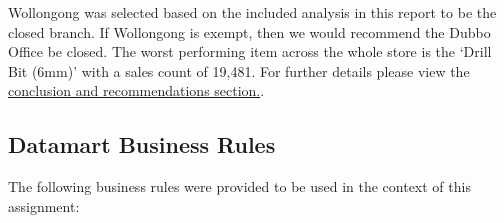 \documentclass{article}
\begin{document}
    \noindent
    Wollongong was selected based on the included analysis in this report to be the closed branch.
    If Wollongong is exempt, then we would recommend the Dubbo Office
    be closed. The worst performing item across the whole store is the ‘Drill Bit (6mm)’
    with a sales count of 19,481. For further details please view the \hyperref[sec:Conclusion]{\color{blue}conclusion and recommendations section.}.
	
\newpage


    \subsection{Datamart Business Rules}
    The following business rules were provided to be used in the context of this assignment:
\end{document}

